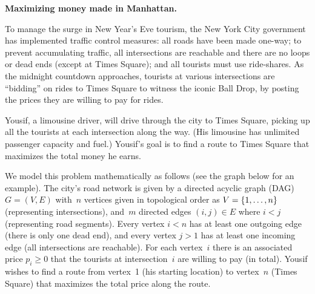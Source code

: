 \documentclass[11pt,addpoints]{exam}
\begin{document}
\begin{questions}

  \question \textbf{Maximizing money made in Manhattan.}

  To manage the surge in New Year's Eve tourism, the New York City government has implemented traffic control measures: all roads have been made one-way; to prevent accumulating traffic, all intersections are reachable and there are no loops or dead ends (except at Times Square); and all tourists must use ride-shares.
  As the midnight countdown approaches, tourists at various intersections are ``bidding'' on rides to Times Square to witness the iconic Ball Drop, by posting the prices they are willing to pay for rides.
  
  Yousif, a limousine driver, will drive through the city to Times Square, picking up all the tourists at each intersection along the way.
  (His limousine has unlimited passenger capacity and fuel.)
  Yousif's goal is to find a route to Times Square that maximizes the total money he earns.

  We model this problem mathematically as follows (see the graph below for an example).
  The city's road network is given by a directed acyclic graph (DAG) $G=(V,E)$ with~$n$ vertices given in topological order as $V=\{1,\ldots,n\}$ (representing intersections), and~$m$ directed edges $(i,j) \in E$ where $i < j$ (representing road segments).
  Every vertex $i < n$ has at least one outgoing edge (there is only one dead end), and every vertex $j > 1$ has at least one incoming edge (all intersections are reachable).
  For each vertex~$i$ there is an associated price $p_{i} \geq 0$ that the tourists at intersection~$i$ are willing to pay (in total).
  Yousif wishes to find a route from vertex~1 (his starting location) to vertex~$n$ (Times Square) that maximizes the total price along the route.


\end{questions}
\end{document}
